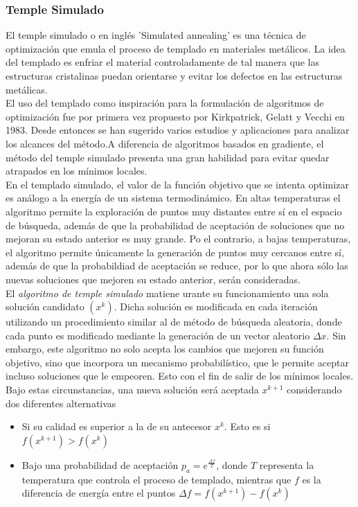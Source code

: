 \documentclass{article}
\begin{document}
\subsubsection{Temple Simulado}
El temple simulado o en ingl\'es 'Simulated annealing' es una t\'ecnica de optimizaci\'on que emula el proceso de templado en materiales met\'alicos. La idea del templado es enfriar el material controladamente de tal manera que las estructuras cristalinas puedan orientarse y evitar los defectos en las estructuras met\'alicas. \\ El uso del templado como inspiraci\'on para la formulaci\'on de algoritmos de optimizaci\'on fue por primera vez propuesto por Kirkpatrick, Gelatt y Vecchi en 1983. Desde entonces se han sugerido varios estudios y aplicaciones para analizar los alcances del m\'etodo.A diferencia de algoritmos basados en gradiente, el m\'etodo del temple simulado presenta una gran habilidad para evitar quedar atrapados en los m\'inimos locales.\\En el templado simulado, el valor de la función objetivo que se intenta optimizar es análogo a la energía de un sistema termodinámico. En altas temperaturas el algoritmo permite la exploración de puntos muy distantes entre sí en el espacio de búsqueda, además de que la probabilidad de aceptación de soluciones que no mejoran su estado anterior es muy grande. Po el contrario, a bajas temperaturas, el algoritmo permite \'unicamente la generaci\'on de puntos muy cercanos entre s\'i, adem\'as de que la probabildiad de aceptaci\'on se reduce, por lo que ahora s\'olo las nuevas soluciones que mejoren su estado anterior, ser\'an consideradas.\\El \textit{algoritmo de temple simulado} matiene urante su funcionamiento una sola soluci\'on candidato $(x^k)$. Dicha soluci\'on es modificada en cada iteraci\'on utilizando un procedimiento similar al de m\'etodo de b\'usqueda aleatoria, donde cada punto es modificado mediante la generaci\'on de un vector aleatorio $\Delta x$. Sin embargo, este algoritmo no solo acepta los cambios que mejoren su funci\'on objetivo, sino que incorpora un mecanismo probabil\'istico, que le permite aceptar incluso soluciones que le empeoren. Esto con el fin de salir de los m\'inimos locales.
\cite{Cuevas(2016)}
Bajo estas circunstancias, una nueva soluci\'on ser\'a aceptada $x^{k+1}$ considerando dos diferentes alternativas
\begin{itemize}
    \item Si su calidad es superior a la de su antecesor $x^k$. Esto es si $f(x^{k+1})>f(x^k)$
    \item Bajo una probabilidad de aceptaci\'on $p_a = e^{\frac{\Delta f}{T}}$, donde $T$ representa la temperatura que controla el proceso de templado, mientras que $f$ es la diferencia de energ\'ia entre el puntos $\Delta f= f(x^{k+1})-f(x^k)$
\end{itemize}
\end{document}
